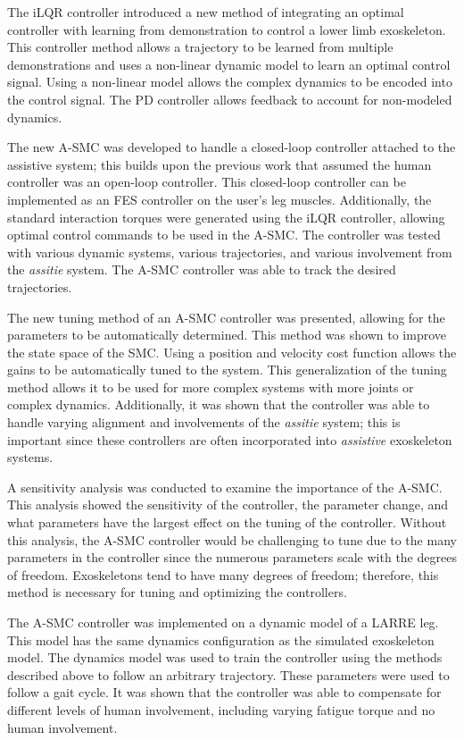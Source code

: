The iLQR controller introduced a new method of integrating an optimal controller with learning from demonstration to control a lower limb exoskeleton. This controller method allows a trajectory to be learned from multiple demonstrations and uses a non-linear dynamic model to learn an optimal control signal. Using a non-linear model allows the complex dynamics to be encoded into the control signal. The PD controller allows feedback to account for non-modeled dynamics. 

The new A-SMC was developed to handle a closed-loop controller attached to the assistive system; this builds upon the previous work that assumed the human controller was an open-loop controller. This closed-loop controller can be implemented as an FES controller on the user's leg muscles. Additionally, the standard interaction torques were generated using the iLQR controller, allowing optimal control commands to be used in the A-SMC. The controller was tested with various dynamic systems, various trajectories, and various involvement from the  \textit{assitie} system. The A-SMC controller was able to track the desired trajectories. 

The new tuning method of an A-SMC controller was presented, allowing for the parameters to be automatically determined. This method was shown to improve the state space of the SMC. Using a position and velocity cost function allows the gains to be automatically tuned to the system. This generalization of the tuning method allows it to be used for more complex systems with more joints or complex dynamics. Additionally, it was shown that the controller was able to handle varying alignment and involvements of the \textit{assitie} system; this is important since these controllers are often incorporated into \textit{assistive} exoskeleton systems. 

A sensitivity analysis was conducted to examine the importance of the A-SMC. This analysis showed the sensitivity of the controller, the parameter change, and what parameters have the largest effect on the tuning of the controller. Without this analysis, the A-SMC controller would be challenging to tune due to the many parameters in the controller since the numerous parameters scale with the degrees of freedom. Exoskeletons tend to have many degrees of freedom; therefore, this method is necessary for tuning and optimizing the controllers.   

The A-SMC controller was implemented on a dynamic model of a LARRE leg. This model has the same dynamics configuration as the simulated exoskeleton model. The dynamics model was used to train the controller using the methods described above to follow an arbitrary trajectory. These parameters were used to follow a gait cycle. It was shown that the controller was able to compensate for different levels of human involvement, including varying fatigue torque and no human involvement.   





